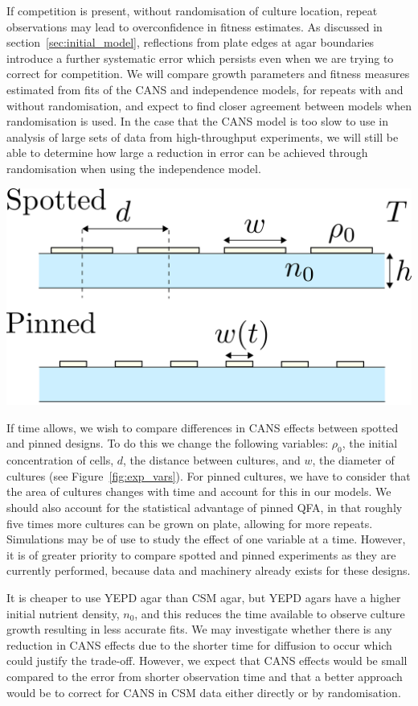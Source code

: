 If competition is present, without randomisation of culture location,
repeat observations may lead to overconfidence in fitness
estimates. As discussed in section~\ref{sec:initial_model},
reflections from plate edges at agar boundaries introduce a further
systematic error which persists even when we are trying to correct
for competition. We will compare growth parameters and fitness
measures estimated from fits of the CANS and independence models, for
repeats with and without randomisation, and expect to find closer
agreement between models when randomisation is used. In the case that
the CANS model is too slow to use in analysis of large sets of
data from high-throughput experiments, we will still be able to
determine how large a reduction in error can be achieved through
randomisation when using the independence model.

\begin{Figure}
  \centering
  \includegraphics[width=\linewidth]{qfa_v_sga_vars}
  \label{fig:exp_vars}
\end{Figure}

If time allows, we wish to compare differences in CANS effects between
spotted and pinned designs. To do this we change the following
variables: \(\rho_{0}\), the initial concentration of cells, \(d\),
the distance between cultures, and \(w\), the diameter of cultures
(see Figure~\ref{fig:exp_vars}). For pinned cultures, we have to
consider that the area of cultures changes with time and account for
this in our models. We should also account for the statistical
advantage of pinned QFA, in that roughly five times more cultures can
be grown on plate, allowing for more repeats. Simulations may be of
use to study the effect of one variable at a time. However, it is of
greater priority to compare spotted and pinned experiments as they are
currently performed, because data and machinery already exists for
these designs.

It is cheaper to use YEPD agar than CSM agar, but YEPD agars have a
higher initial nutrient density, \(n_{0}\), and this reduces the time
available to observe culture growth resulting in less accurate
fits. We may investigate whether there is any reduction in CANS
effects due to the shorter time for diffusion to occur which could
justify the trade-off. However, we expect that CANS effects would be
small compared to the error from shorter observation time and that a
better approach would be to correct for CANS in CSM data either
directly or by randomisation.


